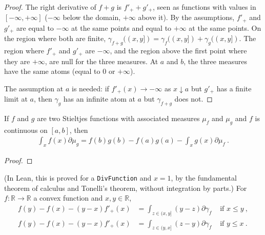 \begin{proof}\leanok
\uses{}
The right derivative of $f+g$ is $f'_+ + g'_+$, seen as functions with values in $[-\infty, +\infty]$ ($-\infty$ below the domain, $+\infty$ above it). By the assumptions, $f'_+$ and $g'_+$ are equal to $-\infty$ at the same points and equal to $+\infty$ at the same points. On the region where both are finite, $\gamma_{f+g}((x,y]) = \gamma_f((x,y]) + \gamma_g((x,y])$. The region where $f'_+$ and $g'_+$ are $-\infty$, and the region above the first point where they are $+\infty$, are null for the three measures. At $a$ and $b$, the three measures have the same atoms (equal to $0$ or $+\infty$).

The assumption at $a$ is needed: if $f'_+(x) \to -\infty$ as $x \downarrow a$ but $g'_+$ has a finite limit at $a$, then $\gamma_g$ has an infinite atom at $a$ but $\gamma_{f+g}$ does not.
\end{proof}


\begin{theorem}
  \label{thm:integration_by_parts}
  \notready
  \uses{}
  If $f$ and $g$ are two Stieltjes functions with associated measures $\mu_f$ and $\mu_g$ and $f$ is continuous on $[a, b]$, then
  \begin{align*}
  \int_x f(x) \partial\mu_g = f(b)g(b) - f(a)g(a) - \int_x g(x) \partial\mu_f \: .
  \end{align*}
\end{theorem}

\begin{proof} \notready
\uses{}

\end{proof}


\begin{lemma}
  \label{lem:convex_taylor}
  \leanok
  (In Lean, this is proved for a \texttt{DivFunction} and $x = 1$, by the fundamental theorem of calculus and Tonelli's theorem, without integration by parts.)
  For $f: \mathbb{R} \to \mathbb{R}$ a convex function and $x,y \in \mathbb{R}$,
  \begin{align*}
  f(y) - f(x) - (y - x)f'_+(x) &= \int_{z \in (x,y]} (y - z) \partial \gamma_f & \text{ if } x \le y \: ,
  \\
  f(y) - f(x) - (y - x)f'_+(x) &= \int_{z \in (y,x]} (z - y) \partial \gamma_f & \text{ if } y \le x \: .
  \end{align*}
\end{lemma}

